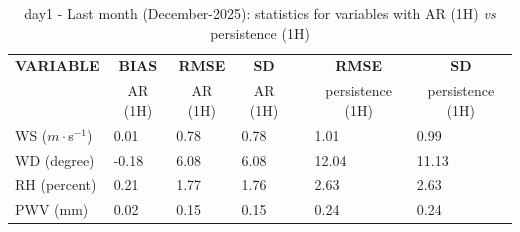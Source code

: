 \begin{table}[]
\begin{center}
\begin{tabular}{|l|l|l|l|l|l|l|}
\hline
\multicolumn{1}{|c|}{\cellcolor[HTML]{C0C0C0}\textbf{VARIABLE}} & \multicolumn{1}{c|}{\cellcolor[HTML]{C0C0C0}\textbf{BIAS}} & \multicolumn{1}{c|}{\cellcolor[HTML]{C0C0C0}\textbf{RMSE}} & \multicolumn{1}{c|}{\cellcolor[HTML]{C0C0C0}\textbf{SD}} & & \multicolumn{1}{c|}{\cellcolor[HTML]{C0C0C0}\textbf{RMSE}} & \multicolumn{1}{c|}{\cellcolor[HTML]{C0C0C0}\textbf{SD}}\\
\multicolumn{1}{|c|}{\cellcolor[HTML]{C0C0C0}} & \multicolumn{1}{c|}{\cellcolor[HTML]{C0C0C0}AR (1H)} & \multicolumn{1}{c|}{\cellcolor[HTML]{C0C0C0}AR (1H)} & \multicolumn{1}{c|}{\cellcolor[HTML]{C0C0C0}AR (1H)} & & \multicolumn{1}{c|}{\cellcolor[HTML]{C0C0C0}persistence (1H)} & \multicolumn{1}{c|}{\cellcolor[HTML]{C0C0C0}persistence (1H)}\\\hline
\cellcolor[HTML]{C0C0C0}WS ($m\cdot$s$^{-1}$) &      0.01  &      0.78  &      0.78  & &      1.01  &      0.99\\
\cellcolor[HTML]{C0C0C0}WD (degree)           &     -0.18  &      6.08  &      6.08  & &     12.04  &     11.13\\
\cellcolor[HTML]{C0C0C0}RH (percent)          &      0.21  &      1.77  &      1.76  & &      2.63  &      2.63\\
\cellcolor[HTML]{C0C0C0}PWV (mm)              &      0.02 &      0.15 &      0.15 & &      0.24 &      0.24\\
\hline
\end{tabular}
\caption{day1 - Last month (December-2025): statistics for variables with AR (1H) \textit{vs} persistence (1H)}\label{tab:day1:statAFT:LM}
\end{center}
\end{table}

